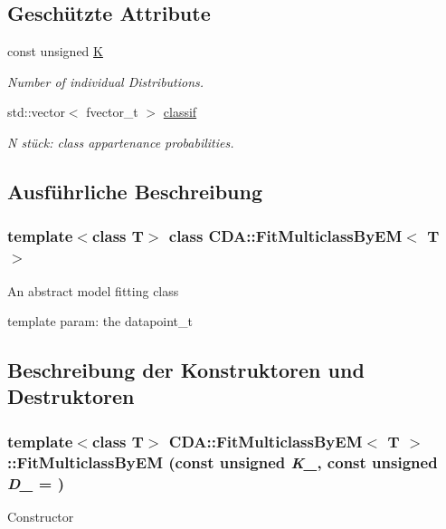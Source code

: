 \subsection*{Geschützte Attribute}
\begin{DoxyCompactItemize}
\item 
\hypertarget{classCDA_1_1FitMulticlassByEM_a85afbb296883c5de3364b161151d9e38}{
const unsigned \hyperlink{classCDA_1_1FitMulticlassByEM_a85afbb296883c5de3364b161151d9e38}{K}}
\label{classCDA_1_1FitMulticlassByEM_a85afbb296883c5de3364b161151d9e38}

\begin{DoxyCompactList}\small\item\em Number of individual Distributions. \item\end{DoxyCompactList}\item 
\hypertarget{classCDA_1_1FitMulticlassByEM_a645a39acd7ead9d005499cbbe533bc73}{
std::vector$<$ fvector\_\-t $>$ \hyperlink{classCDA_1_1FitMulticlassByEM_a645a39acd7ead9d005499cbbe533bc73}{classif}}
\label{classCDA_1_1FitMulticlassByEM_a645a39acd7ead9d005499cbbe533bc73}

\begin{DoxyCompactList}\small\item\em N stück: class appartenance probabilities. \item\end{DoxyCompactList}\end{DoxyCompactItemize}


\subsection{Ausführliche Beschreibung}
\subsubsection*{template$<$class T$>$ class CDA::FitMulticlassByEM$<$ T $>$}

An abstract model fitting class

template param: the datapoint\_\-t 

\subsection{Beschreibung der Konstruktoren und Destruktoren}
\hypertarget{classCDA_1_1FitMulticlassByEM_a832fd114a95fc194a632eabed92fb4c5}{
\subsubsection[{FitMulticlassByEM}]{\setlength{\rightskip}{0pt plus 5cm}template$<$class T$>$ {\bf CDA::FitMulticlassByEM}$<$ T $>$::{\bf FitMulticlassByEM} (const unsigned {\em K\_\-}, \/  const unsigned {\em D\_\-} = {})}}
\label{classCDA_1_1FitMulticlassByEM_a832fd114a95fc194a632eabed92fb4c5}
Constructor

